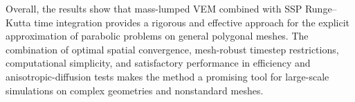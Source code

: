 \documentclass{article}
\begin{document}
Overall, the results show that mass-lumped VEM combined with SSP Runge--Kutta time integration provides a rigorous and effective approach for the explicit approximation of parabolic problems on general polygonal meshes. The combination of optimal spatial convergence, mesh-robust timestep restrictions, computational simplicity, and satisfactory performance in efficiency and anisotropic-diffusion tests makes the method a promising tool for large-scale simulations on complex geometries and nonstandard meshes.



\newpage

  


\end{document}
